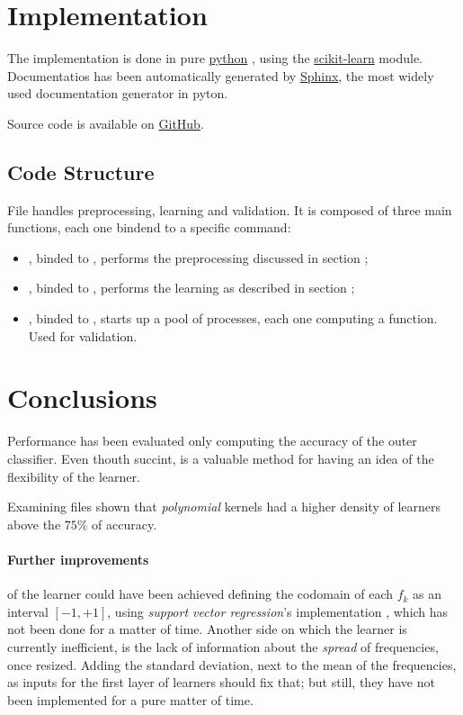 \documentclass[10pt]{article}
\begin{document}
\section{Implementation}
The implementation is done in pure 
\href{https://python.org/}{python}
, using the
\href{http://scikit-learn.org/stable/}{scikit-learn}
module. Documentatios has been automatically generated by
\href{http://sphinx-doc.org/}{Sphinx}, the most widely used documentation generator in pyton.

Source code is available on 
\href{https://github.com/mmaker/braindecoding}{GitHub}.

\subsection{Code Structure}
File  handles preprocessing, learning and validation. It is composed of three main functions, each one bindend to a specific command: 
\begin{itemize}
\item {}, binded to , performs the preprocessing discussed in section ;
\item {}, binded to , performs the learning as described in section ;
\item {}, binded to , starts up a pool of processes, each one computing a  function. Used for validation.
\end{itemize}

\section{Conclusions}
Performance has been evaluated only computing the accuracy of the outer classifier. Even thouth succint, is a valuable method for having an idea of the flexibility of the learner.

Examining files  shown that \emph{polynomial} kernels had a higher density of learners above the $75\%$ of accuracy.

\paragraph{Further improvements} of the learner could have been achieved defining the codomain of each $f_k$ as an interval $[-1, +1]$, using \emph{support vector regression}'s implementation , which has not been done for a matter of time.
Another side on which the learner is currently inefficient, is the lack of information about the \emph{spread} of frequencies, once resized. Adding the standard deviation, next to the mean of the frequencies, as inputs for the first layer of learners should fix that; but still, they have not been implemented for a pure matter of time.
\end{document}
